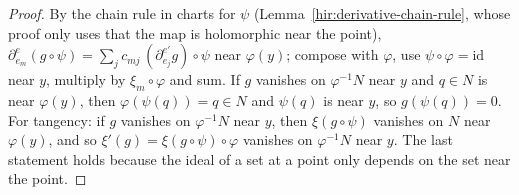 \begin{proof}
\leanok
By the chain rule in charts for \(\psi\) (Lemma~\ref{hir:derivative-chain-rule}, whose proof only uses that the map is holomorphic near the point),
\(\partial^e_{e_m}(g\circ\psi)=\sum_jc_{mj}\,(\partial^{e'}_{e_j}g)\circ\psi\) near \(\varphi(y)\); compose with \(\varphi\), use \(\psi\circ\varphi=\mathrm{id}\) near \(y\), multiply by
\(\xi_m\circ\varphi\) and sum. If \(g\) vanishes on \(\varphi^{-1}N\) near \(y\) and \(q\in N\) is near \(\varphi(y)\), then \(\varphi(\psi(q))=q\in N\) and \(\psi(q)\) is near \(y\),
so \(g(\psi(q))=0\). For tangency: if \(g\) vanishes on \(\varphi^{-1}N\) near \(y\), then \(\xi(g\circ\psi)\) vanishes on \(N\) near \(\varphi(y)\), and so
\(\xi'(g)=\xi(g\circ\psi)\circ\varphi\) vanishes on \(\varphi^{-1}N\) near \(y\). The last statement holds because the ideal of a set at a point only depends on
the set near the point.
\end{proof}

